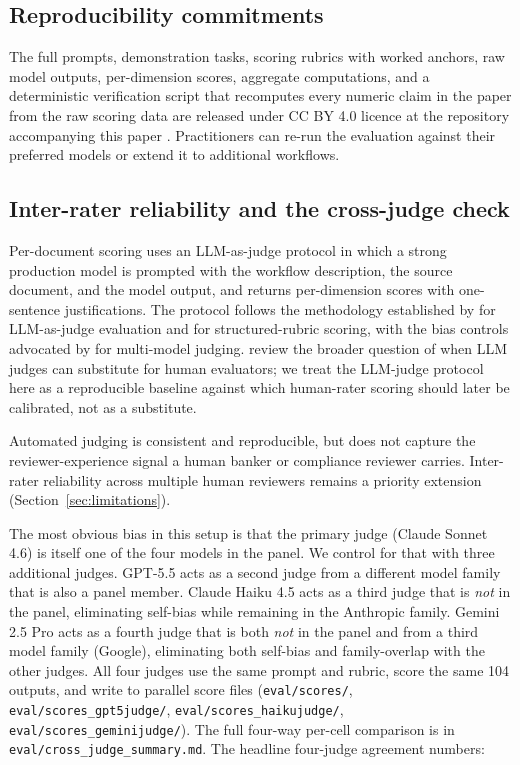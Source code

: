 \documentclass[11pt]{article}
\begin{document}
\subsection{Reproducibility commitments}

The full prompts, demonstration tasks, scoring rubrics with worked anchors, raw model outputs, per-dimension scores, aggregate computations, and a deterministic verification script that recomputes every numeric claim in the paper from the raw scoring data are released under CC BY 4.0 licence at the repository accompanying this paper \citep{cmlrs2026repo}. Practitioners can re-run the evaluation against their preferred models or extend it to additional workflows.

\subsection{Inter-rater reliability and the cross-judge check}

\label{sec:interrater}

Per-document scoring uses an LLM-as-judge protocol in which a strong production model is prompted with the workflow description, the source document, and the model output, and returns per-dimension scores with one-sentence justifications. The protocol follows the methodology established by \citet{zheng2023judging} for LLM-as-judge evaluation and \citet{liu2023geval} for structured-rubric scoring, with the bias controls advocated by \citet{wang2023llmfair} for multi-model judging. \citet{chiang2023humanllm} review the broader question of when LLM judges can substitute for human evaluators; we treat the LLM-judge protocol here as a reproducible baseline against which human-rater scoring should later be calibrated, not as a substitute.

Automated judging is consistent and reproducible, but does not capture the reviewer-experience signal a human banker or compliance reviewer carries. Inter-rater reliability across multiple human reviewers remains a priority extension (Section~\ref{sec:limitations}).

The most obvious bias in this setup is that the primary judge (Claude Sonnet 4.6) is itself one of the four models in the panel. We control for that with three additional judges. GPT-5.5 acts as a second judge from a different model family that is also a panel member. Claude Haiku 4.5 acts as a third judge that is \emph{not} in the panel, eliminating self-bias while remaining in the Anthropic family. Gemini 2.5 Pro acts as a fourth judge that is both \emph{not} in the panel and from a third model family (Google), eliminating both self-bias and family-overlap with the other judges. All four judges use the same prompt and rubric, score the same 104 outputs, and write to parallel score files (\texttt{eval/scores/}, \texttt{eval/scores\_gpt5judge/}, \texttt{eval/scores\_haikujudge/}, \texttt{eval/scores\_geminijudge/}). The full four-way per-cell comparison is in \texttt{eval/cross\_judge\_summary.md}. The headline four-judge agreement numbers:
\end{document}

